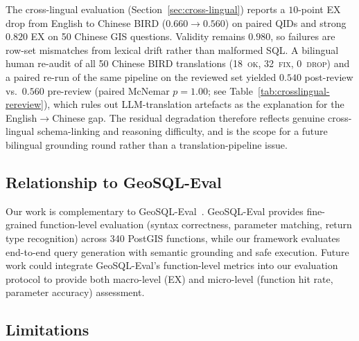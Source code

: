 \documentclass[11pt]{article}
\begin{document}
The cross-lingual evaluation (Section~\ref{sec:cross-lingual}) reports a $10$-point EX drop from English to Chinese BIRD ($0.660 \to 0.560$) on paired QIDs and strong $0.820$ EX on 50 Chinese GIS questions. Validity remains $0.980$, so failures are row-set mismatches from lexical drift rather than malformed SQL. A bilingual human re-audit of all 50 Chinese BIRD translations (18~\textsc{ok}, 32~\textsc{fix}, 0~\textsc{drop}) and a paired re-run of the same pipeline on the reviewed set yielded $0.540$ post-review vs.\ $0.560$ pre-review (paired McNemar $p=1.00$; see Table~\ref{tab:crosslingual-rereview}), which rules out LLM-translation artefacts as the explanation for the English$\to$Chinese gap. The residual degradation therefore reflects genuine cross-lingual schema-linking and reasoning difficulty, and is the scope for a future bilingual grounding round rather than a translation-pipeline issue.

\subsection{Relationship to GeoSQL-Eval}

Our work is complementary to GeoSQL-Eval~\citep{hou2026geosql}. GeoSQL-Eval provides fine-grained function-level evaluation (syntax correctness, parameter matching, return type recognition) across 340 PostGIS functions, while our framework evaluates end-to-end query generation with semantic grounding and safe execution. Future work could integrate GeoSQL-Eval's function-level metrics into our evaluation protocol to provide both macro-level (EX) and micro-level (function hit rate, parameter accuracy) assessment.

\subsection{Limitations}
\end{document}
